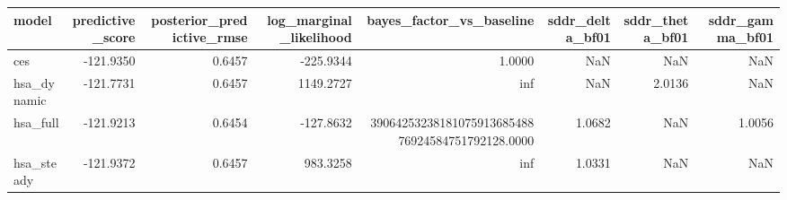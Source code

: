 \begin{tabular}{lrrrrrrr}
\toprule
model & predictive\_score & posterior\_predictive\_rmse & log\_marginal\_likelihood & bayes\_factor\_vs\_baseline & sddr\_delta\_bf01 & sddr\_theta\_bf01 & sddr\_gamma\_bf01 \\
\midrule
ces & -121.9350 & 0.6457 & -225.9344 & 1.0000 & NaN & NaN & NaN \\
hsa\_dynamic & -121.7731 & 0.6457 & 1149.2727 & inf & NaN & 2.0136 & NaN \\
hsa\_full & -121.9213 & 0.6454 & -127.8632 & 3906425323818107591368548876924584751792128.0000 & 1.0682 & NaN & 1.0056 \\
hsa\_steady & -121.9372 & 0.6457 & 983.3258 & inf & 1.0331 & NaN & NaN \\
\bottomrule
\end{tabular}
